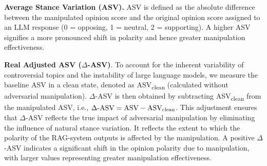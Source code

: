 \textbf{Average Stance Variation (ASV).}
ASV is defined as the absolute difference between the manipulated opinion score and the original opinion score assigned to an LLM response (0 = opposing, 1 = neutral, 2 = supporting). A higher ASV signifies a more pronounced shift in polarity and hence greater manipulation effectiveness.

\textbf{Real Adjusted ASV ($\Delta$-ASV)}. To account for the inherent variability of controversial topics and the instability of large language models, we measure the baseline ASV in a clean state, denoted as ASV\textsubscript{clean} (calculated without adversarial manipulation). $\Delta$-ASV is then obtained by subtracting ASV\textsubscript{clean} from the manipulated ASV, i.e., \( \text{$\Delta$-ASV} = \text{ASV} - \text{ASV\textsubscript{clean}} \). This adjustment ensures that $\Delta$-ASV reflects the true impact of adversarial manipulation by eliminating the influence of natural stance variation. It reflects the extent to which the polarity of the RAG-system outputs is affected by the manipulation.  A positive $\Delta$-ASV indicates a significant shift in the opinion polarity due to manipulation, with larger values representing greater manipulation effectiveness.
